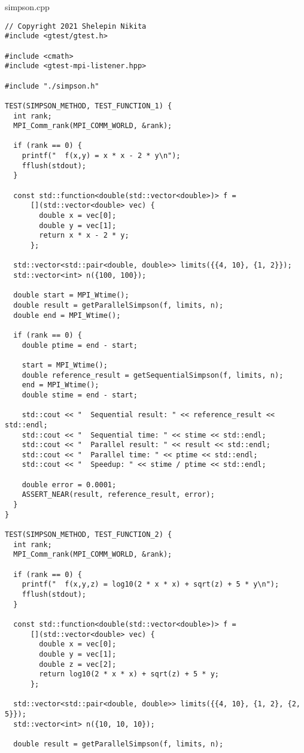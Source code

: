 \documentclass{report}
\begin{document}
simpson.cpp
\begin{lstlisting}
// Copyright 2021 Shelepin Nikita
#include <gtest/gtest.h>

#include <cmath>
#include <gtest-mpi-listener.hpp>

#include "./simpson.h"

TEST(SIMPSON_METHOD, TEST_FUNCTION_1) {
  int rank;
  MPI_Comm_rank(MPI_COMM_WORLD, &rank);

  if (rank == 0) {
    printf("  f(x,y) = x * x - 2 * y\n");
    fflush(stdout);
  }

  const std::function<double(std::vector<double>)> f =
      [](std::vector<double> vec) {
        double x = vec[0];
        double y = vec[1];
        return x * x - 2 * y;
      };

  std::vector<std::pair<double, double>> limits({{4, 10}, {1, 2}});
  std::vector<int> n({100, 100});

  double start = MPI_Wtime();
  double result = getParallelSimpson(f, limits, n);
  double end = MPI_Wtime();

  if (rank == 0) {
    double ptime = end - start;

    start = MPI_Wtime();
    double reference_result = getSequentialSimpson(f, limits, n);
    end = MPI_Wtime();
    double stime = end - start;

    std::cout << "  Sequential result: " << reference_result << std::endl;
    std::cout << "  Sequential time: " << stime << std::endl;
    std::cout << "  Parallel result: " << result << std::endl;
    std::cout << "  Parallel time: " << ptime << std::endl;
    std::cout << "  Speedup: " << stime / ptime << std::endl;

    double error = 0.0001;
    ASSERT_NEAR(result, reference_result, error);
  }
}

TEST(SIMPSON_METHOD, TEST_FUNCTION_2) {
  int rank;
  MPI_Comm_rank(MPI_COMM_WORLD, &rank);

  if (rank == 0) {
    printf("  f(x,y,z) = log10(2 * x * x) + sqrt(z) + 5 * y\n");
    fflush(stdout);
  }

  const std::function<double(std::vector<double>)> f =
      [](std::vector<double> vec) {
        double x = vec[0];
        double y = vec[1];
        double z = vec[2];
        return log10(2 * x * x) + sqrt(z) + 5 * y;
      };

  std::vector<std::pair<double, double>> limits({{4, 10}, {1, 2}, {2, 5}});
  std::vector<int> n({10, 10, 10});

  double result = getParallelSimpson(f, limits, n);


\end{lstlisting}
\end{document}
